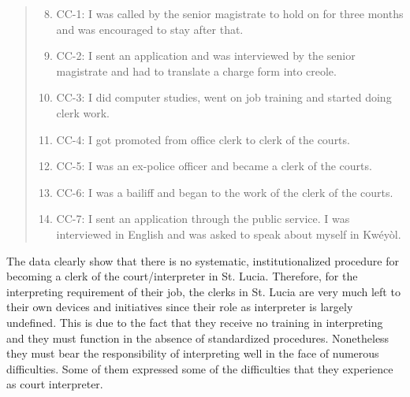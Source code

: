 \documentclass[output=paper,colorlinks,citecolor=brown]{langscibook}
\begin{document}
\begin{quote}
    \begin{enumerate}
    \setcounter{enumi}{7}      
        \item CC-1: I was called by the senior magistrate to hold on for three months and was encouraged to stay after that.

        \item CC-2: I sent an application and was interviewed by the senior magistrate and had to translate a charge form into creole. 

        \item CC-3: I did computer studies, went on job training and started doing clerk work.

        \item CC-4: I got promoted from office clerk to clerk of the courts.

        \item CC-5: I was an ex-police officer and became a clerk of the courts.

        \item CC-6: I was a bailiff and began to the work of the clerk of the courts.

        \item CC-7: I sent an application through the public service. I was interviewed in English and was asked to speak about myself in Kwéyòl.
    \end{enumerate}
\end{quote}

The data clearly show that there is no systematic, institutionalized procedure for becoming a clerk of the court/interpreter in St. Lucia. Therefore, for the interpreting requirement of their job, the clerks in St. Lucia are very much left to their own devices and initiatives since their role as interpreter is largely undefined. This is due to the fact that they receive no training in interpreting and they must function in the absence of standardized procedures. Nonetheless they must bear the responsibility of interpreting well in the face of numerous difficulties. Some of them expressed some of the difficulties that they experience as court interpreter.
\end{document}

